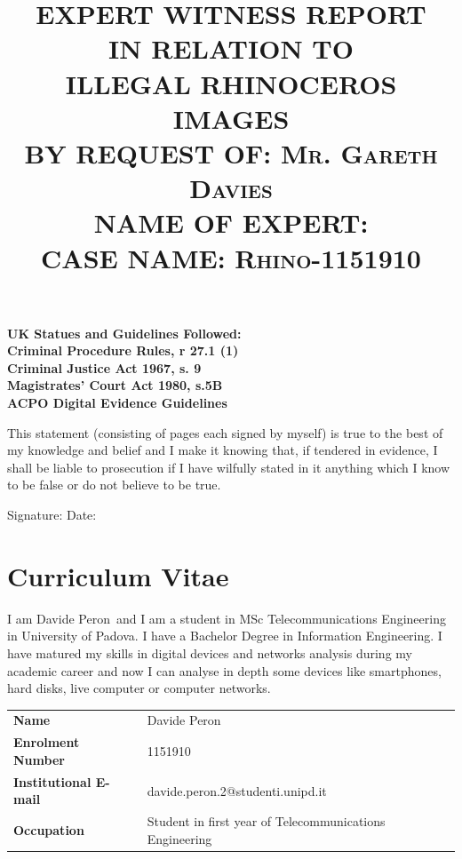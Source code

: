 \documentclass{article}
\title{
	\textmd{\textbf{EXPERT WITNESS REPORT}}\\
	\vspace{0.3in}
	\textsc{\Large IN RELATION TO}\\
	\vspace{0.3in}
	\textmd{\textbf{ILLEGAL RHINOCEROS IMAGES}}\\
	\vspace{0.7in}
	\textmd{\Large \textbf{BY REQUEST OF: }}
	\textsc{\Large Mr. Gareth Davies}\\
	\vspace{0.1in}
	\textmd{\Large \textbf{NAME OF EXPERT: }}
	\textsc{\Large \writer}\\
	\vspace{0.1in}
	\textmd{\Large \textbf{CASE NAME: }}
	\textsc{\Large Rhino-1151910}
	\date{}
}
\newcommand{\writer}{Davide Peron}
\begin{document}
\parbox{0.4\textwidth}{
	\normalsize
	\textbf{UK Statues and Guidelines Followed:\\
	Criminal Procedure Rules, r 27.1 (1)\\
	Criminal Justice Act 1967, s. 9\\
	Magistrates’ Court Act 1980, s.5B\\
	ACPO Digital Evidence Guidelines}
}

\vspace{0.5in}

{\let\newpage\relax\maketitle}

\centering
\parbox{0.7\textwidth}{
	This statement (consisting of \protect\pageref{LastPage}
	pages each signed by myself) is true to the best of
	my knowledge and belief and I make it knowing that, if tendered in evidence, I shall
	be liable to prosecution if I have wilfully stated in it anything which I know to be false
	or do not believe to be true.
}

\parbox{0.7\textwidth}{
	\vspace{0.2in}
	Signature: \hspace{2in} Date:
}


\newpage
\tableofcontents
\newpage

\section{Curriculum Vitae}

I am \writer ~and I am a student in MSc Telecommunications Engineering in University of Padova. I have a Bachelor Degree in Information Engineering.
I have matured my skills in digital devices and networks analysis during my academic career and now I can analyse in depth some devices like smartphones, hard disks, live computer or computer networks.

\vspace{0.3in}

\begin{tabular}{l l}
	\textbf{Name} & \writer\\
	\textbf{Enrolment Number} & 1151910\\
	\textbf{Institutional E-mail} & davide.peron.2@studenti.unipd.it\\
	\textbf{Occupation} & Student in first year of Telecommunications Engineering
\end{tabular}
\end{document}
